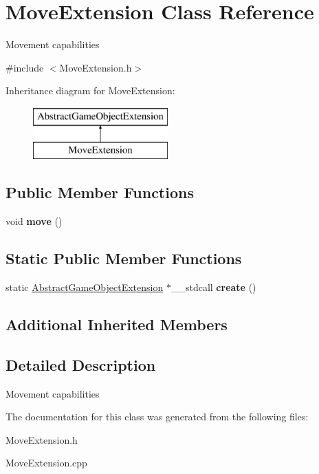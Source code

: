 \hypertarget{class_move_extension}{}\section{Move\+Extension Class Reference}
\label{class_move_extension}


Movement capabilities  




{\ttfamily \#include $<$Move\+Extension.\+h$>$}

Inheritance diagram for Move\+Extension\+:\begin{figure}[H]
\begin{center}
\leavevmode
\includegraphics[height=2.000000cm]{class_move_extension}
\end{center}
\end{figure}
\subsection*{Public Member Functions}
\begin{DoxyCompactItemize}
\item 
\mbox{\label{class_move_extension_a8970d97c5d87073eb2255bb1b29fd8fc}} 
void {\bfseries move} ()
\end{DoxyCompactItemize}
\subsection*{Static Public Member Functions}
\begin{DoxyCompactItemize}
\item 
\mbox{\label{class_move_extension_a45554f4b247dd795a9e8e71614ab677a}} 
static \mbox{\hyperlink{class_abstract_game_object_extension}{Abstract\+Game\+Object\+Extension}} $\ast$\+\_\+\+\_\+stdcall {\bfseries create} ()
\end{DoxyCompactItemize}
\subsection*{Additional Inherited Members}


\subsection{Detailed Description}
Movement capabilities 



The documentation for this class was generated from the following files\+:\begin{DoxyCompactItemize}
\item 
Move\+Extension.\+h\item 
Move\+Extension.\+cpp\end{DoxyCompactItemize}

